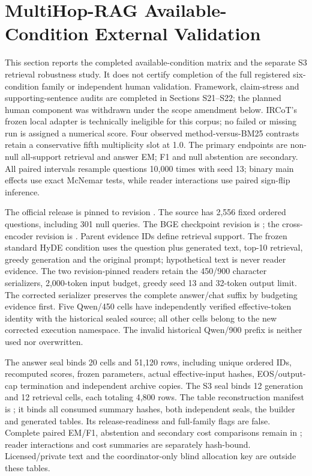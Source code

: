 \FloatBarrier
\section{MultiHop-RAG Available-Condition External Validation}
\label{sec:supp_mhrag_external}

This section reports the completed available-condition matrix and the separate S3 retrieval robustness study. It does not certify completion of the full registered six-condition family or independent human validation. Framework, claim-stress and supporting-sentence audits are completed in Sections S21--S22; the planned human component was withdrawn under the scope amendment below. IRCoT's frozen local adapter is technically ineligible for this corpus; no failed or missing run is assigned a numerical score. Four observed method-versus-BM25 contrasts retain a conservative fifth multiplicity slot at 1.0. The primary endpoints are non-null all-support retrieval and answer EM; F1 and null abstention are secondary. All paired intervals resample questions 10,000 times with seed 13; binary main effects use exact McNemar tests, while reader interactions use paired sign-flip inference.

The official release is pinned to revision . The source has 2,556 fixed ordered questions, including 301 null queries. The BGE checkpoint revision is ; the cross-encoder revision is . Parent evidence IDs define retrieval support. The frozen standard HyDE condition uses the question plus generated text, top-10 retrieval, greedy generation and the original prompt; hypothetical text is never reader evidence. The two revision-pinned readers retain the 450/900 character serializers, 2,000-token input budget, greedy seed 13 and 32-token output limit. The corrected serializer preserves the complete answer/chat suffix by budgeting evidence first. Five Qwen/450 cells have independently verified effective-token identity with the historical sealed source; all other cells belong to the new corrected execution namespace. The invalid historical Qwen/900 prefix is neither used nor overwritten.

The answer seal binds 20 cells and 51,120 rows, including unique ordered IDs, recomputed scores, frozen parameters, actual effective-input hashes, EOS/output-cap termination and independent archive copies. The S3 seal binds 12 generation and 12 retrieval cells, each totaling 4,800 rows. The table reconstruction manifest is ; it binds all consumed summary hashes, both independent seals, the builder and generated tables. Its release-readiness and full-family flags are false. Complete paired EM/F1, abstention and secondary cost comparisons remain in ; reader interactions and cost summaries are separately hash-bound. Licensed/private text and the coordinator-only blind allocation key are outside these tables.

